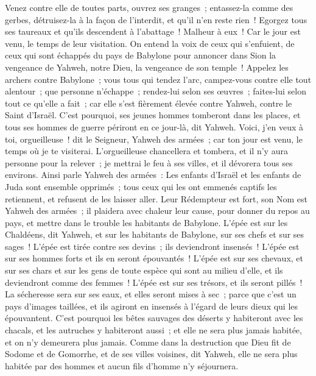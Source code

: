 \begin{multicols}{2}
Venez contre elle de toutes parts, ouvrez ses granges~; entassez-la comme des gerbes, détruisez-la à la façon de l'interdit, et qu'il n'en reste rien~!
Egorgez tous ses taureaux et qu'ils descendent à l'abattage~! Malheur à eux~! Car le jour est venu, le temps de leur visitation.
On entend la voix de ceux qui s'enfuient, de ceux qui sont échappés du pays de Babylone pour annoncer dans Sion la vengeance de Yahweh, notre Dieu, la vengeance de son temple~!
Appelez les archers contre Babylone~; vous tous qui tendez l'arc, campez-vous contre elle tout alentour~; que personne n'échappe~; rendez-lui selon ses œuvres~; faites-lui selon tout ce qu'elle a fait~; car elle s'est fièrement élevée contre Yahweh, contre le Saint d'Israël.
C'est pourquoi, ses jeunes hommes tomberont dans les places, et tous ses hommes de guerre périront en ce jour-là, dit Yahweh.
Voici, j'en veux à toi, orgueilleuse~! dit le Seigneur, Yahweh des armées~; car ton jour est venu, le temps où je te visiterai.
L'orgueilleuse chancellera et tombera, et il n'y aura personne pour la relever~; je mettrai le feu à ses villes, et il dévorera tous ses environs.
Ainsi parle Yahweh des armées~: Les enfants d'Israël et les enfants de Juda sont ensemble opprimés~; tous ceux qui les ont emmenés captifs les retiennent, et refusent de les laisser aller.
Leur Rédempteur est fort, son Nom est Yahweh des armées~; il plaidera avec chaleur leur cause, pour donner du repos au pays, et mettre dans le trouble les habitants de Babylone.
L'épée est sur les Chaldéens, dit Yahweh, et sur les habitants de Babylone, sur ses chefs et sur ses sages~!
L'épée est tirée contre ses devins~; ils deviendront insensés~! L'épée est sur ses hommes forts et ils en seront épouvantés~!
L'épée est sur ses chevaux, et sur ses chars et sur les gens de toute espèce qui sont au milieu d'elle, et ils deviendront comme des femmes~! L'épée est sur ses trésors, et ils seront pillés~!
La sécheresse sera sur ses eaux, et elles seront mises à sec~; parce que c'est un pays d'images taillées, et ils agiront en insensés à l'égard de leurs dieux qui les épouvantent.
C'est pourquoi les bêtes sauvages des déserts y habiteront avec les chacals, et les autruches y habiteront aussi~; et elle ne sera plus jamais habitée, et on n'y demeurera plus jamais.
Comme dans la destruction que Dieu fit de Sodome et de Gomorrhe, et de ses villes voisines, dit Yahweh, elle ne sera plus habitée par des hommes et aucun fils d'homme n'y séjournera.

\end{multicols}

